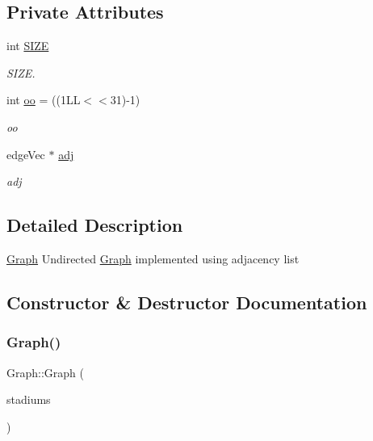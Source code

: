 \subsection*{Private Attributes}
\begin{DoxyCompactItemize}
\item 
\mbox{\label{class_graph_a1500a02236c87c0730754590d0e8ae6e}} 
int \hyperlink{class_graph_a1500a02236c87c0730754590d0e8ae6e}{S\+I\+ZE}
\begin{DoxyCompactList}\small\item\em S\+I\+ZE. \end{DoxyCompactList}\item 
\mbox{\label{class_graph_ac730bd7fc5aca7e1354ca823afb2da61}} 
int \hyperlink{class_graph_ac730bd7fc5aca7e1354ca823afb2da61}{oo} = ((1\+L\+L$<$$<$31)-\/1)
\begin{DoxyCompactList}\small\item\em oo \end{DoxyCompactList}\item 
\mbox{\label{class_graph_aa50616d49b111c54b2352e4eea5fc938}} 
edge\+Vec $\ast$ \hyperlink{class_graph_aa50616d49b111c54b2352e4eea5fc938}{adj}
\begin{DoxyCompactList}\small\item\em adj \end{DoxyCompactList}\end{DoxyCompactItemize}


\subsection{Detailed Description}
\hyperlink{class_graph}{Graph} Undirected \hyperlink{class_graph}{Graph} implemented using adjacency list 

\subsection{Constructor \& Destructor Documentation}
\mbox{\label{class_graph_a30ad544c1ac7ffca896c4f9e3482e4b2}} 
\subsubsection{\texorpdfstring{Graph()}{Graph()}}
{\footnotesize\ttfamily Graph\+::\+Graph (\begin{DoxyParamCaption}\item[{std\+::vector$<$ Q\+String $>$}]{stadiums }\end{DoxyParamCaption})}




